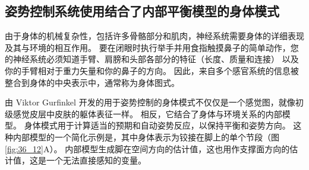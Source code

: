 \subsection{姿势控制系统使用结合了内部平衡模型的身体模式}
由于身体的机械复杂性，包括许多骨骼部分和肌肉，神经系统需要身体的详细表现及其与环境的相互作用。 要在闭眼时执行举手并用食指触摸鼻子的简单动作，您的神经系统必须知道手臂、肩膀和头部各部分的特征（长度、质量和连接） 以及你的手臂相对于重力矢量和你的鼻子的方向。 因此，来自多个感官系统的信息被整合到身体的中央表示中，通常称为身体图式。

由 Viktor Gurfinkel 开发的用于姿势控制的身体模式不仅仅是一个感觉图，就像初级感觉皮层中皮肤的躯体表征一样。 相反，它结合了身体与环境关系的内部模型。 身体模式用于计算适当的预期和自动姿势反应，以保持平衡和姿势方向。 
这种内部模型的一个简化示例是，其中身体表示为铰接在脚上的单个节段（图 \ref{fig:36_12}A）。 
内部模型生成脚在空间方向的估计值，这也用作支撑面方向的估计值，这是一个无法直接感知的变量。

